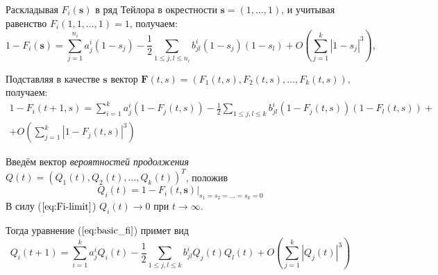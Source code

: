 \documentclass[12pt]{article}
\renewcommand{\leq}{\leqslant}
\begin{document}
{Раскладывая $F_i(\mathbf{s})$ в ряд Тейлора в окрестности $\mathbf{s} = (1, \ldots, 1)$, и учитывая равенство $F_i(1, 1, \ldots, 1) = 1$, получаем:
\begin{equation}
	1 - F_i(\mathbf{s}) = \sum_{j = 1}^{n_i} a^i_j(1 - s_j) - \frac{1}{2} \sum_{1 \leq j,l \leq n_i} b^i_{jl} (1 - s_j) (1 - s_l) + O\left(\sum_{j = 1}^k \left| 1 - s_j \right|^3\right),
\end{equation}

Подставляя в качестве $\textbf{s}$ вектор $\textbf{F}(t, s) = (F_1(t, s), F_2(t, s), \ldots, F_k(t, s))$, получаем:
\begin{multline}
\label{eq:basic_fi}
	1 - F_i(t + 1, s) = \sum_{i = 1}^k a^i_j (1 - F_j(t,s)) - \frac{1}{2} \sum_{1 \leq j,l \leq k} b^i_{jl} (1 - F_j(t,s)) (1 - F_l(t,s)) + \\
	+ O\left( \sum_{j = 1}^k \left| 1 - F_j(t,s) \right|^3 \right)
\end{multline}

Введём вектор \textit{вероятностей продолжения} $Q(t) = (Q_1(t), Q_2(t), \ldots, Q_k(t))^T$, положив
\begin{equation}
	Q_i(t) = 1 - \left. F_i(t, \textbf{s}) \right|_{s_1 = s_2 = \ldots = s_k = 0}
\end{equation}
В силу ($\ref{eq:Fi-limit}$) $Q_i(t) \rightarrow 0$ при $t \rightarrow \infty$.

Тогда уравнение ($\ref{eq:basic_fi}$) примет вид
\begin{equation}
\label{eq:basic_qi}
	Q_i(t+1) = \sum_{i = 1}^k a^i_j Q_i(t) - \frac{1}{2} \sum_{1 \leq j,l \leq k} b^i_{jl} Q_j(t) Q_l(t) + O \left( \sum_{j = 1}^k \left| Q_j(t) \right|^3 \right)
\end{equation}

}
\end{document}
